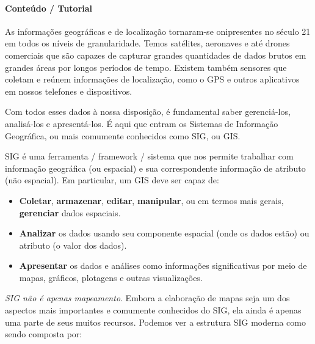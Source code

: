 \documentclass[
]{book}
\providecommand{\tightlist}{%
  \setlength{\itemsep}{0pt}\setlength{\parskip}{0pt}}
\begin{document}
\hypertarget{conteuxfado-tutorial-2}{%
\paragraph{Conteúdo / Tutorial}\label{conteuxfado-tutorial-2}}

As informações geográficas e de localização tornaram-se onipresentes no século 21 em todos os níveis de granularidade. Temos satélites, aeronaves e até drones comerciais que são capazes de capturar grandes quantidades de dados brutos em grandes áreas por longos períodos de tempo. Existem também sensores que coletam e reúnem informações de localização, como o GPS e outros aplicativos em nossos telefones e dispositivos.

Com todos esses dados à nossa disposição, é fundamental saber gerenciá-los, analisá-los e apresentá-los. É aqui que entram os Sistemas de Informação Geográfica, ou mais comumente conhecidos como SIG, ou GIS.

SIG é uma ferramenta / framework / sistema que nos permite trabalhar com informação geográfica (ou espacial) e sua correspondente informação de atributo (não espacial). Em particular, um GIS deve ser capaz de:

\begin{itemize}
\tightlist
\item
  \textbf{Coletar}, \textbf{armazenar}, \textbf{editar}, \textbf{manipular}, ou em termos mais gerais, \textbf{gerenciar} dados espaciais.
\item
  \textbf{Analizar} os dados usando seu componente espacial (onde os dados estão) ou atributo (o valor dos dados).
\item
  \textbf{Apresentar} os dados e análises como informações significativas por meio de mapas, gráficos, plotagens e outras visualizações.
\end{itemize}

\emph{SIG não é apenas mapeamento}. Embora a elaboração de mapas seja um dos aspectos mais importantes e comumente conhecidos do SIG, ela ainda é apenas uma parte de seus muitos recursos. Podemos ver a estrutura SIG moderna como sendo composta por:
\end{document}
